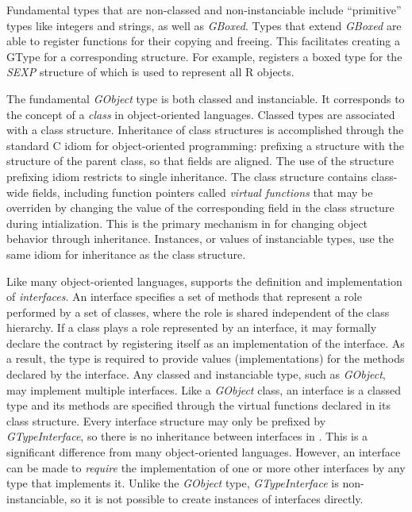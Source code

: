 \documentclass[article]{jss}
\begin{document}
Fundamental types that are non-classed and non-instanciable 
include ``primitive'' types like integers and strings, as well as
\emph{GBoxed}.
Types that extend \emph{GBoxed} are able to register functions for
their
copying and freeing. This facilitates creating a GType for a
corresponding
 structure. For example,  registers a boxed
type for 
the \emph{SEXP} structure of  which is used to represent
all R objects. 

The fundamental \emph{GObject} type is both classed and instanciable. It corresponds to the concept of a \emph{class} in object-oriented languages. Classed types are associated with a class structure. Inheritance of class structures is accomplished through the standard C idiom for object-oriented programming: prefixing a structure with the structure of the parent class, so that fields are aligned. The use of the structure prefixing idiom restricts  to single inheritance. The class structure contains class-wide fields, including function pointers called \emph{virtual functions} that may be overriden by changing the value of the corresponding field in the class structure during intialization. This is the primary mechanism in  for changing object behavior through inheritance. Instances, or values of instanciable types, use the same idiom for inheritance as the class structure.

Like many object-oriented languages,  supports the definition and implementation of \emph{interfaces}. An interface specifies a set of methods that represent a role performed by a set of classes, where the role is shared independent of the class hierarchy. If a class plays a role represented by an interface, it may formally declare the contract by registering itself as an implementation of the interface. As a result, the type is required to provide values (implementations) for the methods declared by the interface. Any classed and instanciable type, such as \emph{GObject}, may implement multiple interfaces. Like a \emph{GObject} class, an interface is a classed type and its methods are specified through the virtual functions declared in its class structure. Every interface structure may only be prefixed by \emph{GTypeInterface}, so there is no inheritance between interfaces in . This is a significant difference from many object-oriented languages. However, an interface can be made to \emph{require} the implementation of one or more other interfaces by any type that implements it. Unlike the \emph{GObject} type, \emph{GTypeInterface} is non-instanciable, so it is not possible to create instances of interfaces directly.
\end{document}

